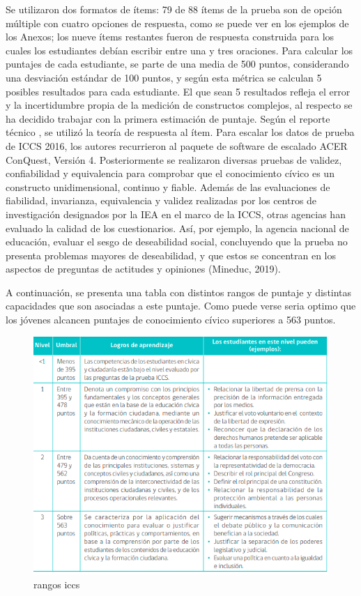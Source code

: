 \documentclass[12pt,twoside]{templates/facsothesis}
\begin{document}
Se utilizaron dos formatos de ítems: 79 de 88 ítems de la prueba son de opción múltiple con cuatro opciones de respuesta, como se puede ver en los ejemplos de los Anexos; los nueve ítems restantes fueron de respuesta construida para los cuales los estudiantes debían escribir entre una y tres oraciones. Para calcular los puntajes de cada estudiante, se parte de una media de 500 puntos, considerando una desviación estándar de 100 puntos, y según esta métrica se calculan 5 posibles resultados para cada estudiante. El que sean 5 resultados refleja el error y la incertidumbre propia de la medición de constructos complejos, al respecto se ha decidido trabajar con la primera estimación de puntaje. Según el reporte técnico \citep{schulz_ICCS_2016}, se utilizó la teoría de respuesta al ítem. Para escalar los datos de prueba de ICCS 2016, los autores recurrieron al paquete de software de escalado ACER ConQuest, Versión 4. Posteriormente se realizaron diversas pruebas de validez, confiabilidad y equivalencia para comprobar que el conocimiento cívico es un constructo unidimensional, continuo y fiable.
Además de las evaluaciones de fiabilidad, invarianza, equivalencia y validez realizadas por los centros de investigación designados por la IEA en el marco de la ICCS, otras agencias han evaluado la calidad de los cuestionarios. Así, por ejemplo, la agencia nacional de educación, evaluar el sesgo de deseabilidad social, concluyendo que la prueba no presenta problemas mayores de deseabilidad, y que estos se concentran en los aspectos de preguntas de actitudes y opiniones (Mineduc, 2019).

A continuación, se presenta una tabla con distintos rangos de puntaje y distintas capacidades que son asociadas a este puntaje. Como puede verse seria optimo que los jóvenes alcancen puntajes de conocimiento cívico superiores a 563 puntos.

\begin{figure}[!ht]

{\centering \includegraphics[width=0.8\linewidth,]{images/puntajesdecorteiccs} 

}

\caption{rangos iccs}\label{fig:unnamed-chunk-5}
\end{figure}
\end{document}
